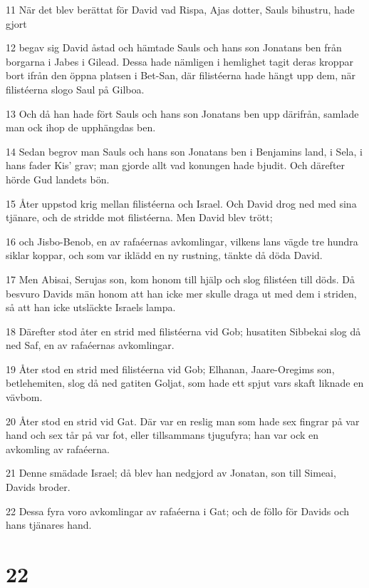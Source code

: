 \par 11 När det blev berättat för David vad Rispa, Ajas dotter, Sauls bihustru, hade gjort
\par 12 begav sig David åstad och hämtade Sauls och hans son Jonatans ben från borgarna i Jabes i Gilead. Dessa hade nämligen i hemlighet tagit deras kroppar bort ifrån den öppna platsen i Bet-San, där filistéerna hade hängt upp dem, när filistéerna slogo Saul på Gilboa.
\par 13 Och då han hade fört Sauls och hans son Jonatans ben upp därifrån, samlade man ock ihop de upphängdas ben.
\par 14 Sedan begrov man Sauls och hans son Jonatans ben i Benjamins land, i Sela, i hans fader Kis' grav; man gjorde allt vad konungen hade bjudit. Och därefter hörde Gud landets bön.
\par 15 Åter uppstod krig mellan filistéerna och Israel. Och David drog ned med sina tjänare, och de stridde mot filistéerna. Men David blev trött;
\par 16 och Jisbo-Benob, en av rafaéernas avkomlingar, vilkens lans vägde tre hundra siklar koppar, och som var iklädd en ny rustning, tänkte då döda David.
\par 17 Men Abisai, Serujas son, kom honom till hjälp och slog filistéen till döds. Då besvuro Davids män honom att han icke mer skulle draga ut med dem i striden, så att han icke utsläckte Israels lampa.
\par 18 Därefter stod åter en strid med filistéerna vid Gob; husatiten Sibbekai slog då ned Saf, en av rafaéernas avkomlingar.
\par 19 Åter stod en strid med filistéerna vid Gob; Elhanan, Jaare-Oregims son, betlehemiten, slog då ned gatiten Goljat, som hade ett spjut vars skaft liknade en vävbom.
\par 20 Åter stod en strid vid Gat. Där var en reslig man som hade sex fingrar på var hand och sex tår på var fot, eller tillsammans tjugufyra; han var ock en avkomling av rafaéerna.
\par 21 Denne smädade Israel; då blev han nedgjord av Jonatan, son till Simeai, Davids broder.
\par 22 Dessa fyra voro avkomlingar av rafaéerna i Gat; och de föllo för Davids och hans tjänares hand.

\chapter{22}


